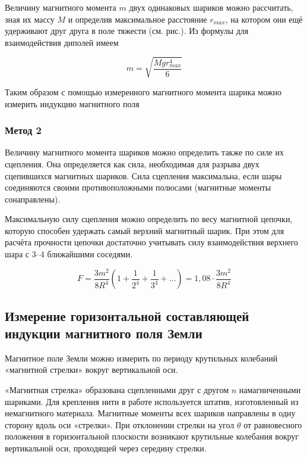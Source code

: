 \documentclass[a4paper, 12pt]{article}%
\begin{document}
Величину магнитного момента $m$ двух одинаковых шариков можно рассчитать, зная их массу $M$ и определив максимальное расстояние $r_{max}$, на котором они ещё удерживают друг друга в поле тяжести (см. рис.). Из формулы для взаимодействия диполей имеем

\begin{equation}
    m = \sqrt{\frac{Mgr^4_{max}}{6}}
\end{equation}

Таким образом с помощью измеренного магнитного момента шарика можно измерить индукцию магнитного поля


\subsubsection{Метод 2}

Величину магнитного момента шариков можно определить также по силе их сцепления. Она определяется как сила, необходимая для разрыва двух сцепившихся магнитных шариков. Сила сцепления максимальна, если шары соединяются своими противоположными полюсами (магнитные моменты сонаправлены).

Максимальную силу сцепления можно определить по весу магнитной цепочки, которую способен удержать самый верхний магнитный шарик. При этом для расчёта прочности цепочки достаточно учитывать силу взаимодействия верхнего шара с 3–4 ближайшими соседями.

\begin{equation}
    F = \frac{3m^2}{8R^4} \left( 1 + \frac{1}{2^4} + \frac{1}{3^4} + ...\right) = 1,08 \cdot \frac{3m^2}{8R^4}
\end{equation}

\subsection{Измерение горизонтальной составляющей индукции магнитного поля Земли}

Магнитное поле Земли можно измерить по периоду крутильных колебаний «магнитной стрелки» вокруг вертикальной оси.

«Магнитная стрелка» образована сцепленными друг с другом $n$ намагниченными шариками. Для крепления нити в работе используется штатив, изготовленный из немагнитного материала. Магнитные моменты всех шариков направлены в одну сторону вдоль оси «стрелки». При отклонении стрелки на угол $\theta$ от равновесного положения в горизонтальной плоскости возникают крутильные колебания вокруг вертикальной оси, проходящей через середину стрелки.
\end{document}
